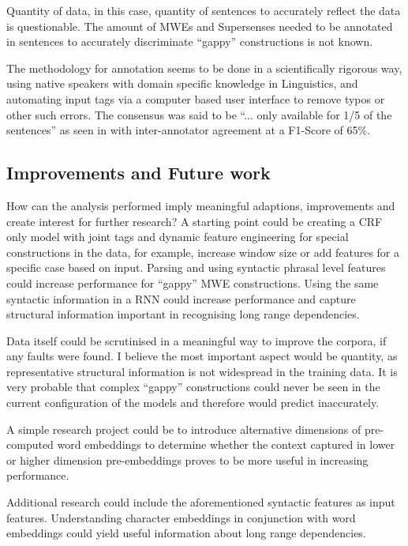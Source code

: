 Quantity of data, in this case, quantity of sentences to accurately reflect the data is questionable. The amount of MWEs and Supersenses needed to be annotated in sentences to accurately discriminate ``gappy'' constructions is not known. 

The methodology for annotation seems to be done in a scientifically rigorous way, using native speakers with domain specific knowledge in Linguistics, and automating input tags via a computer based user interface to remove typos or other such errors. The consensus was said to be ``... only available for 1/5 of the sentences'' as seen in \cite{Schneider2014a} with inter-annotator agreement at a F1-Score of 65\%. 

\subsection{Improvements and Future work}\label{chapter5discussionimprovements}

How can the analysis performed imply meaningful adaptions, improvements and create interest for further research? A starting point could be creating a CRF only model with joint tags and dynamic feature engineering for special constructions in the data, for example, increase window size or add features for a specific case based on input. Parsing and using syntactic phrasal level features could increase performance for ``gappy'' MWE constructions. Using the same syntactic information in a RNN could increase performance and capture structural information important in recognising long range dependencies. 

Data itself could be scrutinised in a meaningful way to improve the corpora, if any faults were found. I believe the most important aspect would be quantity, as representative structural information is not widespread in the training data. It is very probable that complex ``gappy'' constructions could never be seen in the current configuration of the models and therefore would predict inaccurately. 

A simple research project could be to introduce alternative dimensions of pre-computed word embeddings to determine whether the context captured in lower or higher dimension pre-embeddings proves to be more useful in increasing performance. 

Additional research could include the aforementioned syntactic features as input features. Understanding character embeddings in conjunction with word embeddings could yield useful information about long range dependencies.
